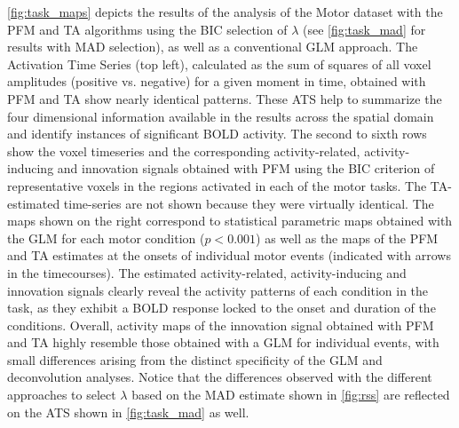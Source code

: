 \cref{fig:task_maps} depicts the results of the analysis of the Motor dataset
with the PFM and TA algorithms using the BIC selection of $\lambda$ (see
\cref{fig:task_mad} for results with MAD selection), as well as a conventional
GLM approach. The Activation Time Series (top left), calculated as the sum of
squares of all voxel amplitudes (positive vs. negative) for a given moment in
time, obtained with PFM and TA show nearly identical patterns. These ATS help to
summarize the four dimensional information available in the results across the
spatial domain and identify instances of significant BOLD activity. The second
to sixth rows show the voxel timeseries and the corresponding activity-related,
activity-inducing and innovation signals obtained with PFM using the BIC
criterion of representative voxels in the regions activated in each of the motor
tasks. The TA-estimated time-series are not shown because they were virtually
identical. The maps shown on the right correspond to statistical parametric maps
obtained with the GLM for each motor condition ($p < 0.001$) as well as the maps
of the PFM and TA estimates at the onsets of individual motor events (indicated
with arrows in the timecourses). The estimated activity-related,
activity-inducing and innovation signals clearly reveal the activity patterns of
each condition in the task, as they exhibit a BOLD response locked to the onset
and duration of the conditions. Overall, activity maps of the innovation signal
obtained with PFM and TA highly resemble those obtained with a GLM for
individual events, with small differences arising from the distinct specificity
of the GLM and deconvolution analyses. Notice that the differences observed with
the different approaches to select $\lambda$ based on the MAD estimate shown in
\cref{fig:rss} are reflected on the ATS shown in \cref{fig:task_mad} as well.

